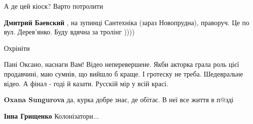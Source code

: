 \begin{itemize}
А де цей кіоск? Варто потролити


\begin{itemize}
 
\textbf{Дмитрий Баевский} , на зупинці Сантехніка (зараз Новопрудна), праворуч.
Це по вул. Дерев'янко. Буду вдячна за тролінг ))))
\end{itemize}

 
Охрініти

 

Пані Оксано, наснаги Вам! Відео неперевершене. Якби акторка грала роль цієї
продавчині, маю сумнів, що вийшло б краще. І гротеску не треба. Шедевральне
відео. А фінал - годі й казати. Русскій мір у всій красі.

\begin{itemize}
 
\textbf{Oxana Sungurova} да, курка добре знає, де обітає. В неї все життя в п@зді🤣

 
\textbf{Інна Грищенко} Колонізатори...

 

\end{itemize}
\end{itemize}
